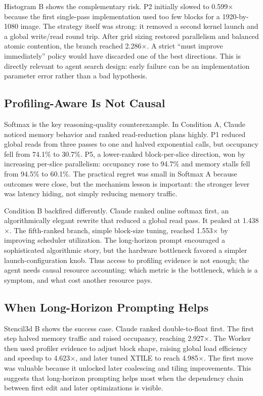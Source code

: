 \documentclass[conference]{IEEEtran}
\begin{document}
Histogram B shows the complementary risk. P2 initially slowed to
0.599$\times$ because the first single-pass implementation used too few blocks
for a 1920-by-1080 image. The strategy itself was strong: it removed a second
kernel launch and a global write/read round trip. After grid sizing restored
parallelism and balanced atomic contention, the branch reached 2.286$\times$.
A strict ``must improve immediately'' policy would have discarded one of the
best directions. This is directly relevant to agent search design: early
failure can be an implementation parameter error rather than a bad hypothesis.

\subsection{Profiling-Aware Is Not Causal}

Softmax is the key reasoning-quality counterexample. In Condition A, Claude
noticed memory behavior and ranked read-reduction plans highly. P1 reduced
global reads from three passes to one and halved exponential calls, but
occupancy fell from 74.1\% to 30.7\%. P5, a lower-ranked block-per-slice
direction, won by increasing per-slice parallelism: occupancy rose to 94.7\%
and memory stalls fell from 94.5\% to 60.1\%. The practical regret was small in
Softmax A because outcomes were close, but the mechanism lesson is important:
the stronger lever was latency hiding, not simply reducing memory traffic.

Condition B backfired differently. Claude ranked online softmax first, an
algorithmically elegant rewrite that reduced a global read pass. It peaked at
1.438$\times$. The fifth-ranked branch, simple block-size tuning, reached
1.553$\times$ by improving scheduler utilization. The long-horizon prompt
encouraged a sophisticated algorithmic story, but the hardware bottleneck
favored a simpler launch-configuration knob. Thus access to profiling evidence
is not enough; the agent needs causal resource accounting: which metric is the
bottleneck, which is a symptom, and what cost another resource pays.

\subsection{When Long-Horizon Prompting Helps}

Stencil3d B shows the success case. Claude ranked double-to-float first. The
first step halved memory traffic and raised occupancy, reaching
2.927$\times$. The Worker then used profiler evidence to adjust block shape,
raising global load efficiency and speedup to 4.623$\times$, and later tuned
XTILE to reach 4.985$\times$. The first move was valuable because it unlocked
later coalescing and tiling improvements. This suggests that long-horizon
prompting helps most when the dependency chain between first edit and later
optimizations is visible.
\end{document}
